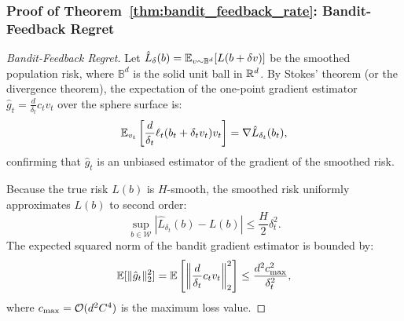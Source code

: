 \subsubsection*{Proof of Theorem~\ref{thm:bandit_feedback_rate}: Bandit-Feedback Regret}
\label{app:proof_bandit_feedback_rate}
\begin{proof}[Bandit-Feedback Regret]
Let $\hat{L}_{\delta}(b) = \mathbb{E}_{v \sim \mathbb{B}^d}[L(b + \delta v)]$ be the smoothed population risk, where $\mathbb{B}^d$ is the solid unit ball in $\mathbb{R}^d$. By Stokes' theorem (or the divergence theorem), the expectation of the one-point gradient estimator $\hat{g}_t = \frac{d}{\delta_t} c_t v_t$ over the sphere surface is:
\begin{equation}
    \mathbb{E}_{v_t}\left[ \frac{d}{\delta_t} \ell_t(b_t + \delta_t v_t) v_t \right] = \nabla \hat{L}_{\delta_t}(b_t),
\end{equation}
confirming that $\hat{g}_t$ is an unbiased estimator of the gradient of the smoothed risk.

Because the true risk $L(b)$ is $H$-smooth, the smoothed risk uniformly approximates $L(b)$ to second order:
\begin{equation}
    \sup_{b \in \mathcal{W}} |\hat{L}_{\delta_t}(b) - L(b)| \le \frac{H}{2} \delta_t^2.
\end{equation}
The expected squared norm of the bandit gradient estimator is bounded by:
\begin{equation}
    \mathbb{E}[\|\hat{g}_t\|_2^2] = \mathbb{E}\left[ \left\| \frac{d}{\delta_t} c_t v_t \right\|_2^2 \right] \le \frac{d^2 c_{\max}^2}{\delta_t^2},
\end{equation}
where $c_{\max} = \mathcal{O}(d^2 C^4)$ is the maximum loss value.


\end{proof}

